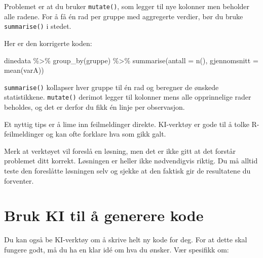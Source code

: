 \documentclass[
  norsk,
  letterpaper,
  DIV=11,
  numbers=noendperiod]{scrreprt}
\newenvironment{Shaded}{\begin{snugshade}}{\end{snugshade}}
\newcommand{\AttributeTok}[1]{\textcolor[rgb]{0.40,0.45,0.13}{#1}}
\newcommand{\FunctionTok}[1]{\textcolor[rgb]{0.28,0.35,0.67}{#1}}
\newcommand{\NormalTok}[1]{\textcolor[rgb]{0.00,0.23,0.31}{#1}}
\newcommand{\SpecialCharTok}[1]{\textcolor[rgb]{0.37,0.37,0.37}{#1}}
\theoremstyle{definition}
\theoremstyle{remark}
\begin{document}
\begin{tcolorbox}[enhanced jigsaw, breakable, colbacktitle=quarto-callout-note-color!10!white, arc=.35mm, leftrule=.75mm, bottomrule=.15mm, colback=white, coltitle=black, opacityback=0, toptitle=1mm, title=\textcolor{quarto-callout-note-color}{\faInfo}\hspace{0.5em}{Eksempel på svar fra KI-verktøy}, colframe=quarto-callout-note-color-frame, toprule=.15mm, opacitybacktitle=0.6, titlerule=0mm, bottomtitle=1mm, rightrule=.15mm, left=2mm]

Problemet er at du bruker \texttt{mutate()}, som legger til nye kolonner
men beholder alle radene. For å få én rad per gruppe med aggregerte
verdier, bør du bruke \texttt{summarise()} i stedet.

Her er den korrigerte koden:

\begin{Shaded}
\begin{Highlighting}[]
\NormalTok{dinedata }\SpecialCharTok{\%\textgreater{}\%}
  \FunctionTok{group\_by}\NormalTok{(gruppe) }\SpecialCharTok{\%\textgreater{}\%}
  \FunctionTok{summarise}\NormalTok{(}\AttributeTok{antall =} \FunctionTok{n}\NormalTok{(),}
            \AttributeTok{gjennomsnitt =} \FunctionTok{mean}\NormalTok{(varA))}
\end{Highlighting}
\end{Shaded}

\texttt{summarise()} kollapser hver gruppe til én rad og beregner de
ønskede statistikkene. \texttt{mutate()} derimot legger til kolonner
mens alle opprinnelige rader beholdes, og det er derfor du fikk én linje
per observasjon.

\end{tcolorbox}

Et nyttig tips er å lime inn feilmeldinger direkte. KI-verktøy er gode
til å tolke R-feilmeldinger og kan ofte forklare hva som gikk galt.

Merk at verktøyet vil foreslå en løsning, men det er ikke gitt at det
forstår problemet ditt korrekt. Løsningen er heller ikke nødvendigvis
riktig. Du må alltid teste den foreslåtte løsningen selv og sjekke at
den faktisk gir de resultatene du forventer.

\section{Bruk KI til å generere
kode}\label{bruk-ki-til-uxe5-generere-kode}

Du kan også be KI-verktøy om å skrive helt ny kode for deg. For at dette
skal fungere godt, må du ha en klar idé om hva du ønsker. Vær spesifikk
om:
\end{document}
